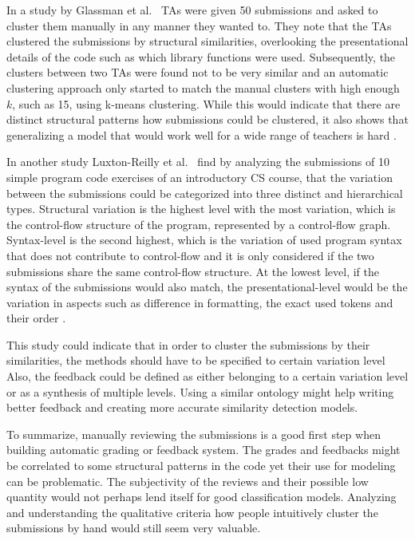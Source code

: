 In a study by Glassman et al.~\cite{glass-feature-engineering} TAs were given 50 submissions and asked to cluster them manually in any manner they wanted to. They note that the TAs clustered the submissions by structural similarities, overlooking the presentational details of the code such as which library functions were used. Subsequently, the clusters between two TAs were found not to be very similar and an automatic clustering approach only started to match the manual clusters with high enough $k$, such as 15, using k-means clustering. While this would indicate that there are distinct structural patterns how submissions could be clustered, it also shows that generalizing a model that would work well for a wide range of teachers is hard \cite{glass-feature-engineering}.

In another study Luxton-Reilly et al.~\cite{luxton-sub-variation-2013} find by analyzing the submissions of 10 simple program code exercises of an introductory CS course, that the variation between the submissions could be categorized into three distinct and hierarchical types. Structural variation is the highest level with the most variation, which is the control-flow structure of the program, represented by a control-flow graph. Syntax-level is the second highest, which is the variation of used program syntax that does not contribute to control-flow and it is only considered if the two submissions share the same control-flow structure. At the lowest level, if the syntax of the submissions would also match, the presentational-level would be the variation in aspects such as difference in formatting, the exact used tokens and their order \cite{luxton-sub-variation-2013}.

This study could indicate that in order to cluster the submissions by their similarities, the methods should have to be specified to certain variation level Also, the feedback could be defined as either belonging to a certain variation level or as a synthesis of multiple levels. Using a similar ontology might help writing better feedback and creating more accurate similarity detection models.

To summarize, manually reviewing the submissions is a good first step when building automatic grading or feedback system. The grades and feedbacks might be correlated to some structural patterns in the code yet their use for modeling can be problematic. The subjectivity of the reviews and their possible low quantity would not perhaps lend itself for good classification models. Analyzing and understanding the qualitative criteria how people intuitively cluster the submissions by hand would still seem very valuable. 

